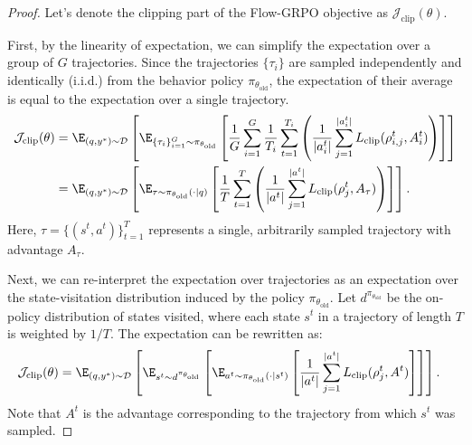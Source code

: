 \begin{proof}
\label{app:proof_clip_term_equalization}
Let's denote the clipping part of the Flow-GRPO objective as $\mathcal{J}_{\text{clip}}(\theta)$.

First, by the linearity of expectation, we can simplify the expectation over a group of $G$ trajectories. Since the trajectories $\{\tau_i\}$ are sampled independently and identically (i.i.d.) from the behavior policy $\pi_{\theta_{\text{old}}}$, the expectation of their average is equal to the expectation over a single trajectory.
\begin{align}
    \mathcal{J}_{\text{clip}}(\theta) &= \E_{(q,y^*) \sim \mathcal{D}} \left[ \E_{\{\tau_i\}_{i=1}^G \sim \pi_{\theta_{\text{old}}}} \left[ \frac{1}{G} \sum_{i=1}^G \frac{1}{T_i} \sum_{t=1}^{T_i} \left( \frac{1}{|a^t_i|} \sum_{j=1}^{|a^t_i|} L_{\text{clip}}(\rho_{i,j}^t, A_i^t) \right) \right] \right] \\
    &= \E_{(q,y^*) \sim \mathcal{D}} \left[ \E_{\tau \sim \pi_{\theta_{\text{old}}}(\cdot|q)} \left[ \frac{1}{T} \sum_{t=1}^{T} \left( \frac{1}{|a^t|} \sum_{j=1}^{|a^t|} L_{\text{clip}}(\rho^t_j, A_\tau) \right) \right] \right].
\end{align}
Here, $\tau = \{(s^t, a^t)\}_{t=1}^T$ represents a single, arbitrarily sampled trajectory with advantage $A_\tau$.

Next, we can re-interpret the expectation over trajectories as an expectation over the state-visitation distribution induced by the policy $\pi_{\theta_{\text{old}}}$. Let $d^{\pi_{\theta_{\text{old}}}}$ be the on-policy distribution of states visited, where each state $s^t$ in a trajectory of length $T$ is weighted by $1/T$. The expectation can be rewritten as:
\begin{align}
    \mathcal{J}_{\text{clip}}(\theta) &= \E_{(q,y^*) \sim \mathcal{D}} \left[ \E_{s^t \sim d^{\pi_{\theta_{\text{old}}}}} \left[ \E_{a^t \sim \pi_{\theta_{\text{old}}}(\cdot|s^t)} \left[ \frac{1}{|a^t|} \sum_{j=1}^{|a^t|} L_{\text{clip}}(\rho^t_j, A^t) \right] \right] \right].
\end{align}
Note that $A^t$ is the advantage corresponding to the trajectory from which $s^t$ was sampled.


\end{proof}
